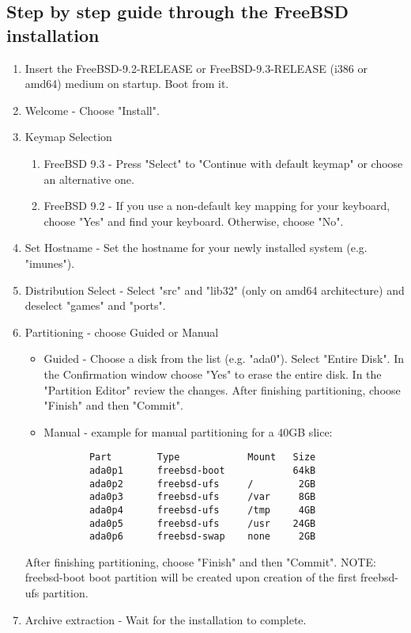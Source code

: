 \subsection{Step by step guide through the FreeBSD installation}
\begin{enumerate}
\item Insert the FreeBSD-9.2-RELEASE or FreeBSD-9.3-RELEASE (i386 or amd64) medium on startup. Boot from it.
\item Welcome - Choose "Install".
\item Keymap Selection
	\begin{enumerate}
		\item FreeBSD 9.3 - Press "Select" to "Continue with default keymap" or choose an alternative one.
		\item FreeBSD 9.2 - If you use a non-default key mapping for your keyboard, choose "Yes" and find your keyboard. Otherwise, choose "No".
	\end{enumerate}
\item Set Hostname - Set the hostname for your newly installed system (e.g. "imunes").
\item Distribution Select - Select "src" and "lib32" (only on amd64 architecture) and deselect "games" and "ports".
\item Partitioning - choose Guided or Manual
	\begin{itemize}
	\item Guided - Choose a disk from the list (e.g. "ada0"). Select "Entire Disk". In the Confirmation window choose "Yes" to erase the entire disk. In the "Partition Editor" review the changes. 	After finishing partitioning, choose "Finish" and then "Commit".
	\item Manual - example for manual partitioning for a 40GB slice:
	    \begin{verbatim}
	    Part        Type            Mount   Size
	    ada0p1      freebsd-boot            64kB
	    ada0p2      freebsd-ufs     /        2GB
	    ada0p3      freebsd-ufs     /var     8GB
	    ada0p4      freebsd-ufs     /tmp     4GB
	    ada0p5      freebsd-ufs     /usr    24GB
	    ada0p6      freebsd-swap    none     2GB
	    \end{verbatim}
	\end{itemize}
	After finishing partitioning, choose "Finish" and then "Commit".
NOTE: freebsd-boot boot partition will be created upon creation of the first freebsd-ufs partition.
\item Archive extraction - Wait for the installation to complete.

\end{enumerate}
